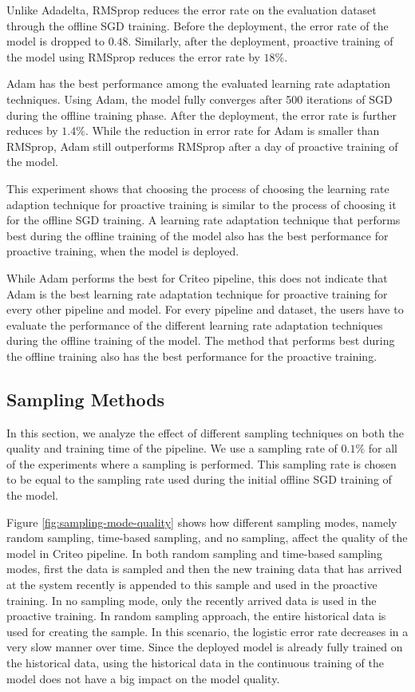 Unlike Adadelta, RMSprop reduces the error rate on the evaluation dataset through the offline SGD training.
Before the deployment, the error rate of the model is dropped to $0.48$.
Similarly, after the deployment, proactive training of the model using RMSprop reduces the error rate by $18\%$.

Adam has the best performance among the evaluated learning rate adaptation techniques.
Using Adam, the model fully converges after 500 iterations of SGD during the offline training phase.
After the deployment, the error rate is further reduces by $1.4\%$.
While the reduction in error rate for Adam is smaller than RMSprop, Adam still outperforms RMSprop after a day of proactive training of the model.

This experiment shows that choosing the process of choosing the learning rate adaption technique for proactive training is similar to the process of choosing it for the offline SGD training.
A learning rate adaptation technique that performs best during the offline training of the model also has the best performance for proactive training, when the model is deployed.

While Adam performs the best for Criteo pipeline, this does not indicate that Adam is the best learning rate adaptation technique for proactive training for every other pipeline and model.
For every pipeline and dataset, the users have to evaluate the performance of the different learning rate adaptation techniques during the offline training of the model.
The method that performs best during the offline training also has the best performance for the proactive training.

\subsection{Sampling Methods}
In this section, we analyze the effect of different sampling techniques on both the quality and training time of the pipeline.
We use a sampling rate of $0.1\%$ for all of the experiments where a sampling is performed.
This sampling rate is chosen to be equal to the sampling rate used during the initial offline SGD training of the model.

Figure \ref{fig:sampling-mode-quality} shows how different sampling modes, namely random sampling, time-based sampling, and no sampling, affect the quality of the model in Criteo pipeline.
In both random sampling and time-based sampling modes, first the data is sampled and then the new training data that has arrived at the system recently is appended to this sample and used in the proactive training.
In no sampling mode, only the recently arrived data is used in the proactive training.
In random sampling approach, the entire historical data is used for creating the sample.
In this scenario, the logistic error rate decreases in a very slow manner over time.
Since the deployed model is already fully trained on the historical data, using the historical data in the continuous training of the model does not have a big impact on the model quality.

